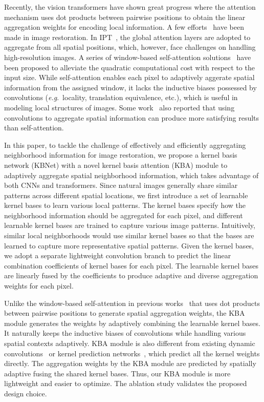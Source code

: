 \documentclass[default,iicol]{sn-jnl}
\theoremstyle{thmstyleone}\newtheorem{theorem}{Theorem}\newtheorem{proposition}[theorem]{Proposition}
\theoremstyle{thmstyletwo}\newtheorem{example}{Example}\newtheorem{remark}{Remark}
\theoremstyle{thmstylethree}\newtheorem{definition}{Definition}
\def\onedot{.~}
\def\eg{\emph{e.g}\onedot} \def\Eg{\emph{E.g}\onedot}
\begin{document}
Recently, the vision transformers have shown great progress where the attention mechanism uses dot products between pairwise positions to obtain the linear aggregation weights for encoding local information. 
A few efforts~\cite{chen2021IPT,wang2021uformer,liang2021swinir,tu2022maxim} have been made in image restoration. In IPT~\cite{chen2021IPT}, the global attention layers are adopted to aggregate from all spatial positions, which, however, face challenges on handling high-resolution images.
A series of window-based self-attention solutions~\cite{wang2021uformer, liang2021swinir, tu2022maxim} have been proposed to alleviate the quadratic computational cost with respect to the input size. 
While self-attention enables each pixel to adaptively aggerate spatial information from the assigned window, it lacks the inductive biases possessed by convolutions (\eg locality, translation equivalence, etc.), which is useful in modeling local structures of images.
Some work~\cite{liu2022convnext,han2021connection,replknet} also reported that using convolutions to aggregate spatial information can produce more satisfying results than self-attention.

In this paper, to tackle the challenge of effectively and efficiently aggregating neighborhood information for image restoration, we propose a kernel basis network (KBNet) with a novel kernel basis attention (KBA) module to adaptively aggregate spatial neighborhood information, which takes advantage of both CNNs and transformers.
Since natural images generally share similar patterns across different spatial locations, 
we first introduce a set of learnable kernel bases to learn various local patterns.
The kernel bases specify how the neighborhood information should be aggregated for each pixel, and different learnable kernel bases are trained to capture various image patterns.
Intuitively, similar local neighborhoods would use similar kernel bases so that the bases are learned to capture more representative spatial patterns.
Given the kernel bases, we adopt a separate lightweight convolution branch to predict the linear combination coefficients of kernel bases for each pixel. 
The learnable kernel bases are linearly fused by the coefficients to produce adaptive and diverse aggregation weights for each pixel. 


Unlike the window-based self-attention in previous works~\cite{liang2021swinir,wang2021uformer,tu2022maxim} that uses dot products between pairwise positions to generate spatial aggregation weights, the KBA module generates the weights by adaptively combining the learnable kernel bases. 
It naturally keeps the inductive biases of convolutions while handling various spatial contexts adaptively. 
KBA module is also different from existing dynamic convolutions~\cite{dynamicConvGao,malleconv} or kernel prediction networks~\cite{mckpn,kpn,xia2020bpn,Wang2019Carafe}, which predict all the kernel weights directly. The aggregation weights by the KBA module are predicted by spatially adaptive fusing the shared kernel bases. Thus, our KBA module is more lightweight and easier to optimize. The ablation study validates the proposed design choice. 
\end{document}
